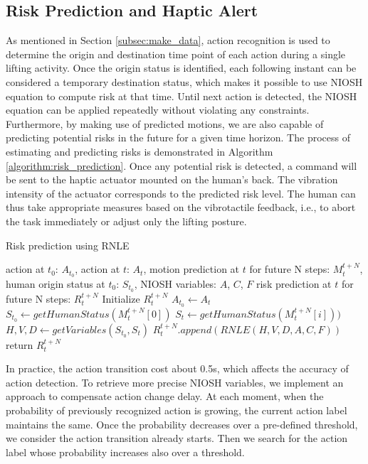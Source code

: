 \subsection{Risk Prediction and Haptic Alert}
\label{sec:RNLE_implementation}
As mentioned in Section \ref{subsec:make_data}, action recognition is used to determine the origin and destination time point of each action during a single lifting activity. Once the origin status is identified, each following instant can be considered a temporary destination status, which makes it possible to use NIOSH equation to compute risk at that time. Until next action is detected, the NIOSH equation can be applied repeatedly without violating any constraints. Furthermore, by making use of predicted motions, we are also capable of predicting potential risks in the future for a given time horizon. The process of estimating and predicting risks is demonstrated in Algorithm \ref{algorithm:risk_prediction}. Once any potential risk is detected, a command will be sent to the haptic actuator mounted on the human's back. The vibration intensity of the actuator corresponds to the predicted risk level. The human can thus take appropriate measures based on the vibrotactile feedback, i.e., to abort the task immediately or adjust only the lifting posture.
\begin{algorithm}[b]
\caption{Risk prediction using RNLE}
\label{algorithm:risk_prediction}
\begin{algorithmic}
\Require action at $t_0$: $A_{t_0}$, action at $t$: $A_t$, motion prediction at $t$ for future N steps: $M_{t}^{t+N}$, human origin status at $t_0$: $S_{t_0}$, NIOSH variables: $A$, $C$, $F$
\Ensure risk prediction at $t$ for future N steps: $R_t^{t+N}$
\State Initialize $R_t^{t+N}$
 
    \State $A_{t_0} \gets A_t$
    \State $S_{t_0} \gets getHumanStatus(M_{t}^{t+N}[0])$
\EndIf
{}
    \State $S_t \gets getHumanStatus(M_{t}^{t+N}[i]))$ 
    \State $H, V, D \gets getVariables(S_{t_0}, S_t)$
    \State $R_t^{t+N}.append(RNLE(H,V,D,A,C,F))$
\EndFor
\State return $R_t^{t+N}$
\EndWhile
\end{algorithmic}
\end{algorithm}

In practice, the action transition cost about 0.5s, which affects the accuracy of action detection. To retrieve more precise NIOSH variables, we implement an approach to compensate action change delay. At each moment, when the probability of previously recognized action is growing, the current action label maintains the same. Once the probability decreases over a pre-defined threshold, we consider the action transition already starts. Then we search for the action label whose probability increases also over a threshold. 

